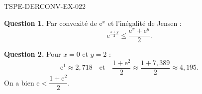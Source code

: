 \begin{corrige}{TSPE-DERCONV-EX-022}

\textbf{Question 1.} Par convexité de $\mathrm{e}^x$ et l'inégalité de Jensen :
\[ \mathrm{e}^{\frac{x+y}{2}} \leq \frac{\mathrm{e}^x + \mathrm{e}^y}{2}. \]


\textbf{Question 2.} Pour $x=0$ et $y=2$ :
\[ \mathrm{e}^{1} \approx 2{,}718 \quad \text{et} \quad \frac{1 + \mathrm{e}^2}{2} \approx \frac{1 + 7{,}389}{2} \approx 4{,}195. \]
On a bien $\mathrm{e} < \dfrac{1 + \mathrm{e}^2}{2}$.

\end{corrige}
